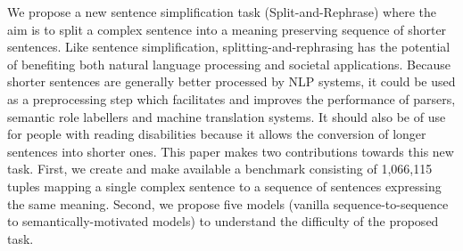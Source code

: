We propose a new sentence simplification task (Split-and-Rephrase) where the aim is to split a complex sentence into a meaning preserving sequence of shorter sentences. Like sentence simplification, splitting-and-rephrasing has the potential of benefiting both natural language processing and societal applications. Because shorter sentences are generally better processed by NLP systems, it could be used as a preprocessing step which facilitates and improves the performance of parsers, semantic role labellers and machine translation systems. It should also be of use for people with reading disabilities because it allows the conversion of longer sentences into shorter ones. This paper makes two contributions towards this new task. First, we create and make available a benchmark consisting of 1,066,115 tuples mapping a single complex sentence to a sequence of sentences expressing the same meaning. Second, we propose five models (vanilla sequence-to-sequence to semantically-motivated models) to understand the difficulty of the proposed task.
